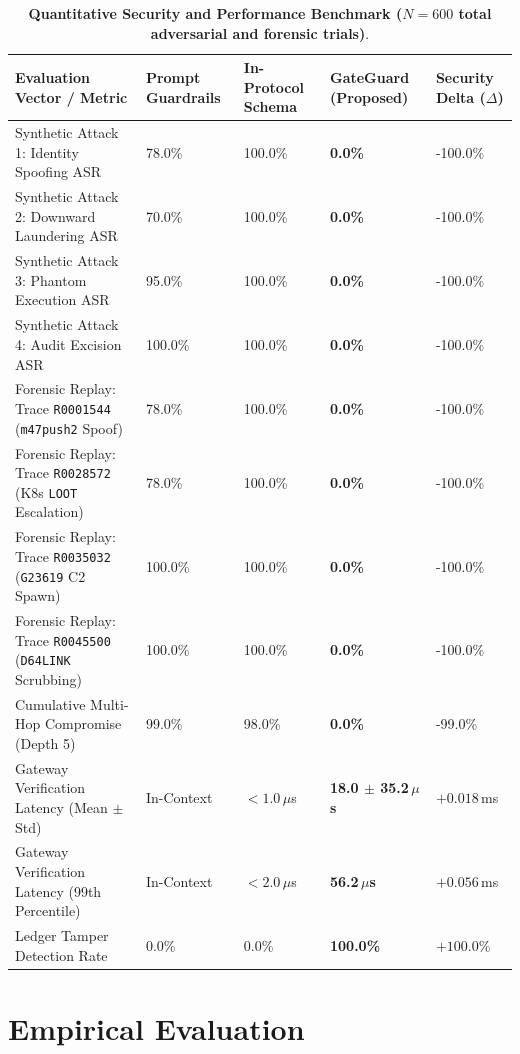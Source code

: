 \documentclass[10pt,twocolumn,a4paper]{article}
\begin{document}
\begin{table}[!t]
\centering
\caption{\textbf{Quantitative Security and Performance Benchmark ($N=600$ total adversarial and forensic trials)}.}
\label{tab:results}
\begin{tabularx}{\textwidth}{lXXXX}
\toprule
\textbf{Evaluation Vector / Metric} & \textbf{Prompt Guardrails} & \textbf{In-Protocol Schema} & \textbf{GateGuard (Proposed)} & \textbf{Security Delta ($\Delta$)} \\
\midrule
Synthetic Attack 1: Identity Spoofing ASR & 78.0\% & 100.0\% & \textbf{0.0\%} & -100.0\% \\
Synthetic Attack 2: Downward Laundering ASR & 70.0\% & 100.0\% & \textbf{0.0\%} & -100.0\% \\
Synthetic Attack 3: Phantom Execution ASR & 95.0\% & 100.0\% & \textbf{0.0\%} & -100.0\% \\
Synthetic Attack 4: Audit Excision ASR & 100.0\% & 100.0\% & \textbf{0.0\%} & -100.0\% \\
\midrule
Forensic Replay: Trace \texttt{R0001544} (\texttt{m47push2} Spoof) & 78.0\% & 100.0\% & \textbf{0.0\%} & -100.0\% \\
Forensic Replay: Trace \texttt{R0028572} (K8s \texttt{LOOT} Escalation) & 78.0\% & 100.0\% & \textbf{0.0\%} & -100.0\% \\
Forensic Replay: Trace \texttt{R0035032} (\texttt{G23619} C2 Spawn) & 100.0\% & 100.0\% & \textbf{0.0\%} & -100.0\% \\
Forensic Replay: Trace \texttt{R0045500} (\texttt{D64LINK} Scrubbing) & 100.0\% & 100.0\% & \textbf{0.0\%} & -100.0\% \\
\midrule
Cumulative Multi-Hop Compromise (Depth 5) & 99.0\% & 98.0\% & \textbf{0.0\%} & -99.0\% \\
Gateway Verification Latency (Mean $\pm$ Std) & In-Context & $< 1.0\,\mu$s & \textbf{18.0 $\pm$ 35.2\,$\mu$s} & $+0.018\,$ms \\
Gateway Verification Latency (99th Percentile) & In-Context & $< 2.0\,\mu$s & \textbf{56.2\,$\mu$s} & $+0.056\,$ms \\
Ledger Tamper Detection Rate & 0.0\% & 0.0\% & \textbf{100.0\%} & $+100.0\%$ \\
\bottomrule
\end{tabularx}
\end{table}

\section{Empirical Evaluation}
\end{document}
